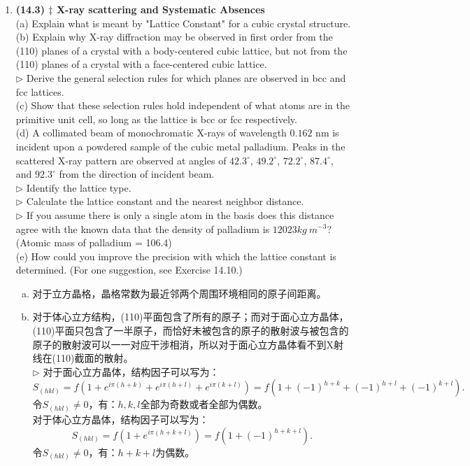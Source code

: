\documentclass[reqno,a4paper,12pt]{amsart}
\begin{document}
\begin{enumerate}[1.]
\item \textbf{(14.3) $\ddagger$ X-ray scattering and Systematic Absences} \\
(a) Explain what is meant by "Lattice Constant" for a cubic crystal structure. \\
(b) Explain why X-ray diffraction may be observed in first order from the (110) planes of a crystal with a body-centered cubic lattice, but not from the (110) planes of a crystal with a face-centered cubic lattice. \\
$\triangleright$ Derive the general selection rules for which planes are observed in bcc and fcc lattices. \\
(c) Show that these selection rules hold independent of what atoms are in the primitive unit cell, so long as the lattice is bcc or fcc respectively. \\
(d) A collimated beam of monochromatic X-rays of wavelength $0.162$ nm is incident upon a powdered sample of the cubic metal palladium. Peaks in the scattered X-ray pattern are observed at angles of $42.3^{\circ}$, $49.2^{\circ}$, $72.2^{\circ}$, $87.4^{\circ}$, and $92.3^{\circ}$ from the direction of incident beam. \\
$\triangleright$ Identify the lattice type. \\
$\triangleright$ Calculate the lattice constant and the nearest neighbor distance. \\
$\triangleright$ If you assume there is only a single atom in the basis does this distance agree with the known data that the density of palladium is $12023 kg~m^{-3}$? (Atomic mass of palladium = 106.4) \\
(e) How could you improve the precision with which the lattice constant is determined. (For one suggestion, see Exercise 14.10.)
\vspace{2ex}
\begin{tcolorbox}[breakable, colback = black!5!white, colframe = black]
\begin{enumerate}[(a)]
\item 对于立方晶格，晶格常数为最近邻两个周围环境相同的原子间距离。

\item 对于体心立方结构，(110)平面包含了所有的原子；而对于面心立方晶体，(110)平面只包含了一半原子，而恰好未被包含的原子的散射波与被包含的原子的散射波可以一一对应干涉相消，所以对于面心立方晶体看不到X射线在(110)截面的散射。 \\
$\triangleright$ 对于面心立方晶体，结构因子可以写为：
\[
	S_{(hkl)} = f \left( 1+e^{i\pi(h+k)} + e^{i\pi(h+l)} + e^{i\pi(k+l)} \right) = f(1+(-1)^{h+k} + (-1)^{h+l} + (-1)^{k+l}).
\]
令$S_{(hkl)} \neq 0$，有：$h,k,l$全部为奇数或者全部为偶数。 \\
对于体心立方晶体，结构因子可以写为：
\[
	S_{(hkl)} =  f \left( 1+e^{i\pi(h+k+l)} \right) = f(1+(-1)^{h+k+l}).
\]
令$S_{(hkl)} \neq 0$，有：$h+k+l$为偶数。 \\


\end{enumerate}
\end{tcolorbox}
\end{enumerate}
\end{document}
